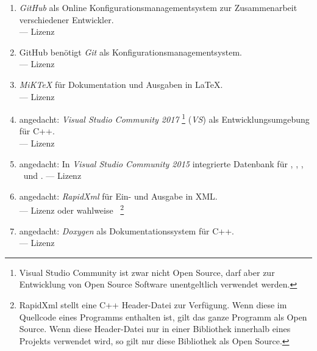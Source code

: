 \begin{enumerate}
	\setcounter{enumi}{\value{Enumi}}%

	\item\label{Werkzeug:GitHub}\emph{GitHub} als Online Konfigurationsmanagementsystem zur Zusammenarbeit verschiedener Entwickler.
	\\
	--- Lizenz 

	\item\label{Werkzeug:Git}GitHub benötigt \emph{Git} als Konfigurationsmanagementsystem.
	\\
	--- Lizenz 

	\item\label{Werkzeug:MiKTeX}\emph{MiK\TeX} für Dokumentation und Ausgaben in \LaTeX.
	\\
	--- Lizenz 

	\item\label{Werkzeug:VSC}angedacht: \emph{Visual Studio Community 2017}%
	\footnote{%
		Visual Studio Community ist zwar nicht Open Source, darf aber zur Entwicklung von Open Source Software
		unentgeltlich verwendet werden.
	}
	(\emph{VS}) als Entwicklungsumgebung für C++.
	\\
	--- Lizenz 

	\item\label{Werkzeug:VSC DB}angedacht: In \emph{Visual Studio Community 2015} integrierte Datenbank für \Ausgabeschemata, \Saetze, \Beweise, \Fachbegriffe\ und \Fachgebiete.
	--- Lizenz 

	\item\label{Werkzeug:RapidXml}angedacht: \emph{RapidXml} für Ein- und Ausgabe in XML.
	\\
	--- Lizenz  oder wahlweise~\cite{bib:MIT}
	\footnote{%
		RapidXml stellt eine C++ Header-Datei zur Verfügung.
		Wenn diese im Quellcode eines Programms enthalten ist, gilt das ganze Programm als Open Source.
		Wenn diese Header-Datei nur in einer Bibliothek innerhalb eines Projekts verwendet wird, so gilt nur diese Bibliothek als Open Source.
	}

	\item\label{Werkzeug:Doxygen}angedacht: \emph{Doxygen} als Dokumentationssystem für C++.
	\\
	--- Lizenz 


\end{enumerate}
